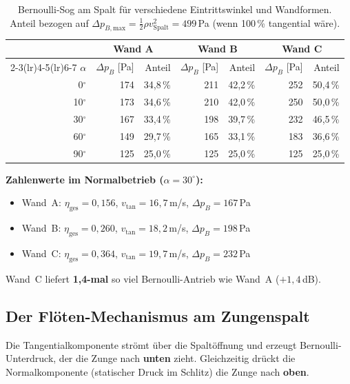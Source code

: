 \documentclass[11pt,a4paper]{article}
\begin{document}
\begin{table}[H]
\centering\small
\begin{tabular}{r r r r r r r}
\toprule
& \multicolumn{2}{c}{\textbf{Wand A}} & \multicolumn{2}{c}{\textbf{Wand B}} & \multicolumn{2}{c}{\textbf{Wand C}} \\
\cmidrule(lr){2-3}\cmidrule(lr){4-5}\cmidrule(lr){6-7}
$\alpha$ & $\Delta p_B$ [Pa] & Anteil & $\Delta p_B$ [Pa] & Anteil & $\Delta p_B$ [Pa] & Anteil \\
\midrule
0${}^\circ$  & 174 & 34{,}8\,\% & 211 & 42{,}2\,\% & 252 & 50{,}4\,\% \\
10${}^\circ$ & 173 & 34{,}6\,\% & 210 & 42{,}0\,\% & 250 & 50{,}0\,\% \\
30${}^\circ$ & 167 & 33{,}4\,\% & 198 & 39{,}7\,\% & 232 & 46{,}5\,\% \\
60${}^\circ$ & 149 & 29{,}7\,\% & 165 & 33{,}1\,\% & 183 & 36{,}6\,\% \\
90${}^\circ$ & 125 & 25{,}0\,\% & 125 & 25{,}0\,\% & 125 & 25{,}0\,\% \\
\bottomrule
\end{tabular}
\caption{Bernoulli-Sog am Spalt für verschiedene Eintrittswinkel und Wandformen. Anteil bezogen auf $\Delta p_{B,\text{max}} = \tfrac{1}{2}\rho v_\text{Spalt}^2 = 499$\,Pa (wenn 100\,\% tangential wäre).}
\end{table}

\textbf{Zahlenwerte im Normalbetrieb ($\alpha = 30^\circ$):}
\begin{itemize}[leftmargin=5mm]
\item Wand~A: $\eta_\text{ges} = 0{,}156$, $v_\text{tan} = 16{,}7$\,m/s, $\Delta p_B = 167$\,Pa
\item Wand~B: $\eta_\text{ges} = 0{,}260$, $v_\text{tan} = 18{,}2$\,m/s, $\Delta p_B = 198$\,Pa
\item Wand~C: $\eta_\text{ges} = 0{,}364$, $v_\text{tan} = 19{,}7$\,m/s, $\Delta p_B = 232$\,Pa
\end{itemize}
Wand~C liefert \textbf{1{,}4-mal} so viel Bernoulli-Antrieb wie Wand~A ($+1{,}4$\,dB).

\subsection{Der Flöten-Mechanismus am Zungenspalt}

Die Tangentialkomponente strömt über die Spaltöffnung und erzeugt Bernoulli-Unterdruck, der die Zunge nach \textbf{unten} zieht. Gleichzeitig drückt die Normalkomponente (statischer Druck im Schlitz) die Zunge nach \textbf{oben}.
\end{document}
